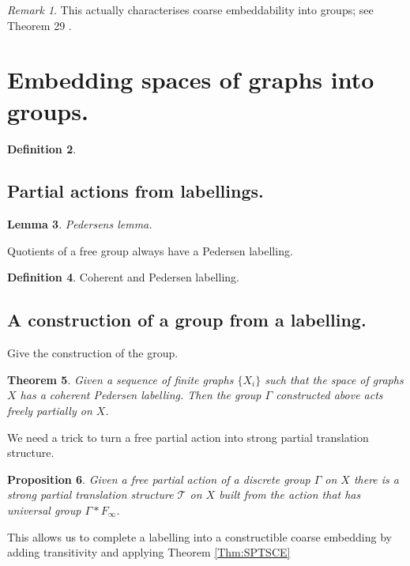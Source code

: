 \documentclass[11pt,a4paper]{amsart}
\theoremstyle{plain}
\newtheorem{theorem}{Theorem}%
\newtheorem{lemma}[theorem]{Lemma}%
\newtheorem{proposition}[theorem]{Proposition}%
\theoremstyle{definition}%
\newtheorem{definition}[theorem]{Definition}%
\theoremstyle{remark}%
\newtheorem{remark}[theorem]{Remark}%
\begin{document}
\begin{remark}
This actually characterises coarse embeddability into groups; see Theorem 29 \cite{}.
\end{remark}

\section{Embedding spaces of graphs into groups.}

\begin{definition}

\end{definition}

\subsection{Partial actions from labellings.}

\begin{lemma}
Pedersens lemma.
\end{lemma}

Quotients of a free group always have a Pedersen labelling. 

\begin{definition}
Coherent and Pedersen labelling.
\end{definition}

\subsection{A construction of a group from a labelling.}

Give the construction of the group.

\begin{theorem}
Given a sequence of finite graphs $\lbrace X_{i} \rbrace$ such that the space of graphs $X$ has a coherent Pedersen labelling. Then the group $\Gamma$ constructed above acts freely partially on $X$.
\end{theorem}

We need a trick to turn a free partial action into strong partial translation structure.

\begin{proposition}\label{Prop:CheapTrick}
Given a free partial action of a discrete group $\Gamma$ on $X$ there is a strong partial translation structure $\mathcal{T}$ on $X$ built from the action that has universal group $\Gamma\ast F_{\infty}$.
\end{proposition}

This allows us to complete a labelling into a constructible coarse embedding by adding transitivity and applying Theorem \ref{Thm:SPTSCE}
\end{document}
